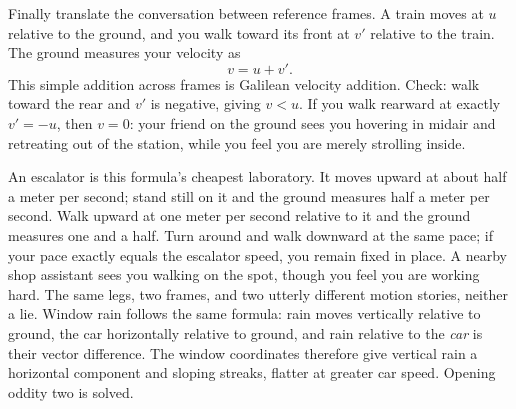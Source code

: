\begin{center}
\end{center}

\begin{mainline}
Finally translate the conversation between reference frames. A train moves at \(u\) relative to the ground, and you walk toward its front at \(v'\) relative to the train. The ground measures your velocity as
\[
  v=u+v'.
\]
This simple addition across frames is Galilean velocity addition. Check: walk toward the rear and \(v'\) is negative, giving \(v<u\). If you walk rearward at exactly \(v'=-u\), then \(v=0\): your friend on the ground sees you hovering in midair and retreating out of the station, while you feel you are merely strolling inside.

An escalator is this formula's cheapest laboratory. It moves upward at about half a meter per second; stand still on it and the ground measures half a meter per second. Walk upward at one meter per second relative to it and the ground measures one and a half. Turn around and walk downward at the same pace; if your pace exactly equals the escalator speed, you remain fixed in place. A nearby shop assistant sees you walking on the spot, though you feel you are working hard. The same legs, two frames, and two utterly different motion stories, neither a lie. Window rain follows the same formula: rain moves vertically relative to ground, the car horizontally relative to ground, and rain relative to the \emph{car} is their vector difference. The window coordinates therefore give vertical rain a horizontal component and sloping streaks, flatter at greater car speed. Opening oddity two is solved.
\end{mainline}

